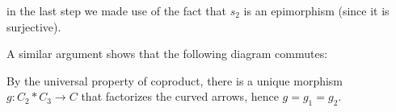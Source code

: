 \documentclass{article}
\def\Z{\mathbb{Z}}
\begin{document}



in the last step we made use of the fact that $s_2$ is an epimorphism (since it is surjective).

A similar argument shows that the following diagram commutes:


By the universal property of coproduct, there is a unique morphism $g: C_2 * C_3 \to C$ that factorizes the curved arrows, hence $g = g_1 = g_2$.
\end{document}
